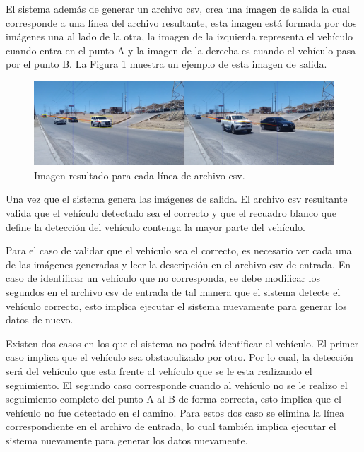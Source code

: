 El sistema además de generar un archivo csv, crea una imagen de salida la cual corresponde a una línea del archivo resultante, esta imagen está formada por dos imágenes una al lado de la otra, la imagen de la izquierda representa el vehículo cuando entra en el punto A y la imagen de la derecha es cuando el vehículo pasa por el punto B. La Figura \ref{fig:Completo} muestra un ejemplo de esta imagen de salida.

\begin{figure}[H]
    \centering
    \includegraphics[width=1\textwidth]{Metodologia/imgs/Completo.jpg}
    \caption{Imagen resultado para cada línea de archivo csv.}
    \label{fig:Completo}
\end{figure}


Una vez que el sistema genera las imágenes de salida. El archivo csv resultante valida que el vehículo detectado sea el correcto y que el recuadro blanco que define la detección del vehículo contenga la mayor parte del vehículo.

Para el caso de validar que el vehículo sea el correcto, es necesario ver cada una de las imágenes generadas y leer la descripción en el archivo csv de entrada. En caso de identificar un vehículo que no corresponda, se debe modificar los segundos en el archivo csv de entrada de tal manera que el sistema detecte el vehículo  correcto, esto implica ejecutar el sistema nuevamente para generar los datos de nuevo. 

Existen dos casos en los que el sistema no podrá identificar el vehículo. El primer caso implica que el vehículo sea obstaculizado por otro. Por lo cual, la detección será del vehículo que esta frente al vehículo que se le esta realizando el seguimiento. El segundo caso corresponde cuando al vehículo no se le realizo el seguimiento completo del punto A al B de forma correcta, esto implica que el vehículo no fue detectado en el camino. Para estos dos caso se elimina la línea correspondiente en el archivo de entrada, lo cual también implica ejecutar el sistema nuevamente para generar los datos nuevamente.


